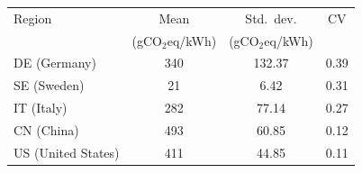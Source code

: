 \begin{tabular}{@{}l S[table-format=3.0] S[table-format=3.2]
  S[table-format=1.2]@{}}
  \toprule
  Region & {Mean} & {Std.\ dev.} & {CV} \\
  & {(gCO$_2$eq/kWh)} & {(gCO$_2$eq/kWh)} & \\
  \midrule
  DE (Germany) & 340 & 132.37 & 0.39 \\
  SE (Sweden) & 21 & 6.42 & 0.31 \\
  IT (Italy) & 282 & 77.14 & 0.27 \\
  CN (China) & 493 & 60.85 & 0.12 \\
  US (United States) & 411 & 44.85 & 0.11 \\
  \bottomrule
\end{tabular}

